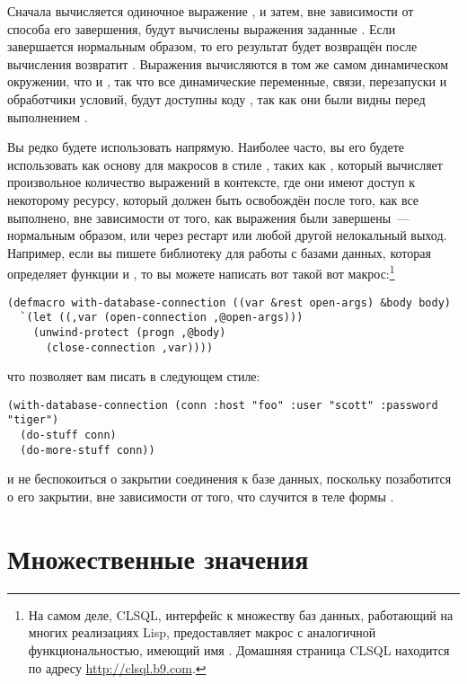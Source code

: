 Сначала вычисляется одиночное выражение , и затем, вне зависимости от
способа его завершения, будут вычислены выражения заданные .  Если
 завершается нормальным образом, то его результат будет возвращён
 после вычисления возвратит . Выражения
 вычисляются в том же самом динамическом окружении, что и
, так что все динамические переменные, связи, перезапуски и
обработчики условий, будут доступны коду , так как они были видны
перед выполнением .

Вы редко будете использовать  напрямую.  Наиболее часто, вы его
будете использовать как основу для макросов в стиле , таких как
, который вычисляет произвольное количество выражений в контексте,
где они имеют доступ к некоторому ресурсу, который должен быть освобождён после того, как
все выполнено, вне зависимости от того, как выражения были завершены~--- нормальным
образом, или через рестарт или любой другой нелокальный выход.  Например, если вы пишете
библиотеку для работы с базами данных, которая определяет функции  и
, то вы можете написать вот такой вот макрос:\footnote{На самом
  деле, CLSQL, интерфейс к множеству баз данных, работающий на многих реализациях Lisp,
  предоставляет макрос с аналогичной функциональностью, имеющий имя .
  Домашняя страница CLSQL находится по адресу \url{http://clsql.b9.com}.}

\begin{lstlisting}
(defmacro with-database-connection ((var &rest open-args) &body body)
  `(let ((,var (open-connection ,@open-args)))
    (unwind-protect (progn ,@body)
      (close-connection ,var))))
\end{lstlisting}

что позволяет вам писать в следующем стиле:

\begin{lstlisting}
(with-database-connection (conn :host "foo" :user "scott" :password "tiger")
  (do-stuff conn)
  (do-more-stuff conn))
\end{lstlisting}

и не беспокоиться о закрытии соединения к базе данных, поскольку 
позаботится о его закрытии, вне зависимости от того, что случится в теле формы
.

\section{Множественные значения}

